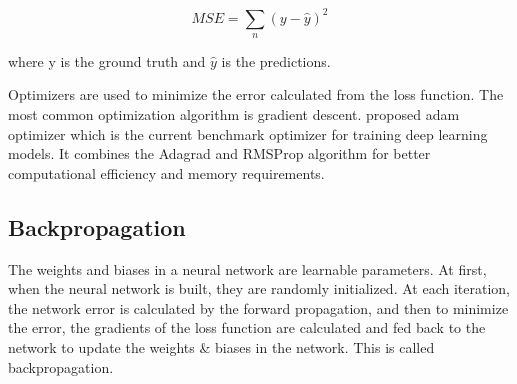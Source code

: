 \begin{equation*}
      MSE =\sum_{n}(y - \widehat{y})^2
\end{equation*}

where y is the ground truth and $\widehat{y}$ is the predictions.
\newline

	Optimizers are used to minimize the error calculated from the loss function. The most common optimization algorithm is gradient descent. \cite{kingma2014adam} proposed \gls{adam} optimizer which is the current benchmark optimizer for training deep learning models. It combines the Adagrad and RMSProp algorithm for better computational efficiency and memory requirements.

\subsection{Backpropagation}

The weights and biases in a neural network are learnable parameters. At first, when the neural network is built, they are randomly initialized. At each iteration, the network error is calculated by the forward propagation, and then to minimize the error, the gradients of the loss function are calculated and fed back to the network to update the weights \& biases in the network. This is called backpropagation.

